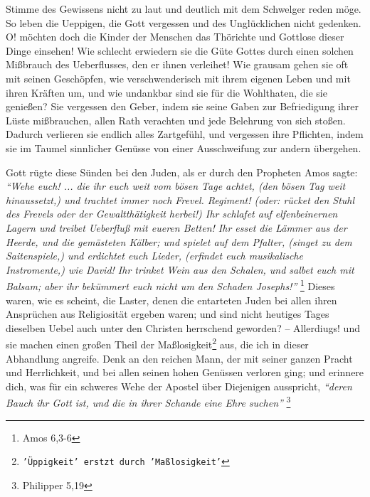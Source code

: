 Stimme des Gewissens nicht zu laut und deutlich mit dem Schwelger reden möge. So
leben die Ueppigen, die Gott vergessen und des Unglücklichen nicht gedenken. O!
möchten doch die Kinder der Menschen das Thörichte und Gottlose dieser Dinge
einsehen! Wie schlecht erwiedern sie die Güte Gottes durch einen solchen
Mißbrauch des Ueberflusses, den er ihnen verleihet! Wie grausam gehen sie oft
mit seinen Geschöpfen, wie verschwenderisch mit ihrem eigenen Leben und mit
ihren Kräften um, und wie undankbar sind sie für die Wohlthaten, die sie
genießen? Sie vergessen den Geber, indem sie seine Gaben zur Befriedigung ihrer
Lüste mißbrauchen, allen Rath verachten und jede Belehrung von sich stoßen.
Dadurch verlieren sie endlich alles Zartgefühl, und vergessen ihre Pflichten,
indem sie im Taumel sinnlicher Genüsse von einer Ausschweifung zur andern
übergehen.

\medskip

Gott rügte diese Sünden bei den Juden, als er durch den Propheten Amos sagte:
\textit{"`Wehe euch! ... die ihr euch weit vom bösen Tage achtet, (den bösen Tag weit
hinaussetzt,) und trachtet immer noch Frevel. Regiment! (oder: rücket den Stuhl
des Frevels oder der Gewaltthätigkeit herbei!) Ihr schlafet auf elfenbeinernen
 Lagern und treibet Ueberfluß mit eueren Betten! Ihr esset die Lämmer aus der
Heerde, und die gemästeten Kälber; und spielet auf dem Pfalter, (singet zu dem
Saitenspiele,) und erdichtet euch Lieder, (erfindet euch musikalische
Instromente,) wie David! Ihr trinket Wein aus den Schalen, und salbet euch mit
Balsam; aber ihr bekümmert euch nicht um den Schaden Josephs!"'}
\footnote{Amos 6,3-6}
Dieses waren, wie es scheint, die Laster, denen die entarteten
Juden bei allen ihren Ansprüchen aus Religiosität ergeben waren; und sind nicht
heutiges Tages dieselben Uebel auch unter den Christen herrschend geworden? --
Allerdiugs! und sie machen einen großen Theil der Maßlosigkeit\footnote{\texttt{'Üppigkeit' erstzt durch 'Maßlosigkeit'}} aus, die ich in
dieser Abhandlung angreife. Denk an den reichen Mann, der mit seiner ganzen
Pracht und Herrlichkeit, und bei allen seinen hohen Genüssen verloren ging; und
erinnere dich, was für ein schweres Wehe der Apostel über Diejenigen ausspricht,
\textit{"`deren Bauch ihr Gott ist, und die in ihrer Schande eine Ehre suchen"'}
\footnote{Philipper 5,19}

